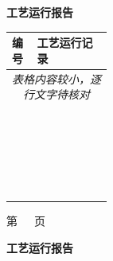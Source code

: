 \documentclass[UTF8,10pt,a4paper,fontset=fandol]{ctexart}
\begin{document}
\begin{center}
\vspace{1.5em}

\begin{minipage}[t]{0.47\textwidth}
\centering
\textbf{工艺运行报告}

\vspace{0.3em}
\scriptsize
\begin{tabularx}{\linewidth}{|p{0.25\linewidth}|X|}
\hline
编号 & 工艺运行记录 \\
\hline
\multicolumn{2}{|c|}{\textit{表格内容较小，逐行文字待核对}}\\
\hline
\multicolumn{2}{|c|}{}\\
\hline
\multicolumn{2}{|c|}{}\\
\hline
\multicolumn{2}{|c|}{}\\
\hline
\multicolumn{2}{|c|}{}\\
\hline
\multicolumn{2}{|c|}{}\\
\hline
\multicolumn{2}{|c|}{}\\
\hline
\multicolumn{2}{|c|}{}\\
\hline
\multicolumn{2}{|c|}{}\\
\hline
\multicolumn{2}{|c|}{}\\
\hline
\multicolumn{2}{|c|}{}\\
\hline
\multicolumn{2}{|c|}{}\\
\hline
\multicolumn{2}{|c|}{}\\
\hline
\multicolumn{2}{|c|}{}\\
\hline
\multicolumn{2}{|c|}{}\\
\hline
\multicolumn{2}{|c|}{}\\
\hline
\multicolumn{2}{|c|}{}\\
\hline
\multicolumn{2}{|c|}{}\\
\hline
\multicolumn{2}{|c|}{}\\
\hline
\multicolumn{2}{|c|}{}\\
\hline
\multicolumn{2}{|c|}{}\\
\hline
\multicolumn{2}{|c|}{}\\
\hline
\multicolumn{2}{|c|}{}\\
\hline
\multicolumn{2}{|c|}{}\\
\hline
\end{tabularx}

\vspace{0.4em}
{\tiny 第\ \ \ 页}
\end{minipage}
\hfill
\begin{minipage}[t]{0.47\textwidth}
\centering
\textbf{工艺运行报告}


\end{minipage}
\end{center}
\end{document}
